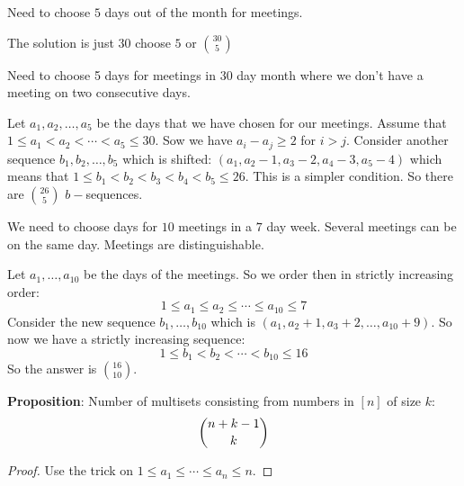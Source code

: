 \documentclass{report}
\begin{document}
\begin{examples}
    \begin{example}
        Need to choose $5$ days out of the month for meetings.
            \begin{answer}
                The solution is just $30$ choose $5$ or $\binom{30}{5}$
            \end{answer}
    \end{example}
    \begin{example}
        Need to choose 5 days for meetings in 30 day month where we don't have a meeting on two consecutive days.
            \begin{answer}
                Let $a_{1}, a_{2}, \ldots, a_{5}$ be the days that we have chosen for our meetings. Assume that $1 \leq a_{1} < a_{2} < \cdots < a_{5} \leq 30$. Sow we have $a_{i} - a_{j} \geq 2$ for $i > j$. Consider another sequence $b_{1}, b_{2}, \ldots, b_{5}$ which is shifted: $(a_{1}, a_{2} - 1, a_{3} - 2, a_{4} - 3, a_{5} - 4)$ which means that $1 \leq b_{1} < b_{2} < b_{3} < b_{4} < b_{5} \leq 26$. This is a simpler condition. So there are $\binom{26}{5}$ $b-$sequences.
            \end{answer}
    \end{example}
    \begin{example}
        We need to choose days for $10$ meetings in a $7$ day week. Several meetings can be on the same day. Meetings are distinguishable.
            \begin{answer}
                Let $a_{1}, \ldots, a_{10}$ be the days of the meetings. So we order then in strictly increasing order:
                    \begin{equation*}
                        1 \leq a_{1} \leq a_{2} \leq \cdots \leq a_{10} \leq 7
                    \end{equation*}
                Consider the new sequence $b_{1}, \ldots, b_{10}$ which is $(a_{1}, a_{2} + 1, a_{3} + 2, \ldots, a_{10} + 9)$. So now we have a strictly increasing sequence:
                    \begin{equation*}
                        1 \leq b_{1} < b_{2} < \cdots < b_{10} \leq 16
                    \end{equation*}
                So the answer is $\binom{16}{10}$.
            \end{answer}
    \end{example}
\end{examples}

\textbf{Proposition}: Number of multisets consisting from numbers in $[n]$ of size $k$:
    \begin{equation*}
        \dbinom{n + k - 1}{k}
    \end{equation*}
\begin{proof}
    Use the trick on $1 \leq a_{1} \leq \cdots \leq a_{n} \leq n$. 
\end{proof}
\end{document}
